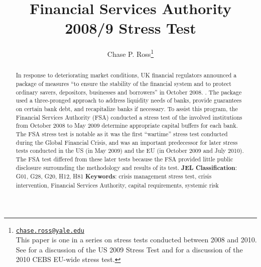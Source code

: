 \documentclass[12pt]{article}
\begin{document}
\lhead{}
\rhead{}

\renewcommand{\headrulewidth}{0.0pt}
\renewcommand{\footrulewidth}{0.0pt}


\title{Financial Services Authority 2008/9 Stress Test}
\author{Chase P. Ross\thanks{\texttt{\href{mailto:chase.ross@yale.edu}{chase.ross@yale.edu}} \\ This paper is one in a series on stress tests conducted between 2008 and 2010. See \citet{Ross2016a} for a discussion of the US 2009 Stress Test and \citet{Ross2016b} for a discussion of the 2010 CEBS EU-wide stress test.}}



\maketitle

\begin{abstract}

In response to deteriorating market conditions, UK financial regulators announced a package of measures ``to ensure the stability of the financial system and to protect ordinary savers, depositors, businesses and borrowers'' in October 2008. \citep{BRSAnnouncement}. The package used a three-pronged approach to address liquidity needs of banks, provide guarantees on certain bank debt, and recapitalize banks if necessary. To assist this program, the Financial Services Authority (FSA) conducted a stress test of the involved institutions from October 2008 to May 2009 determine appropriate capital buffers for each bank. The FSA stress test is notable as it was the first ``wartime'' stress test conducted during the Global Financial Crisis, and was an important predecessor for later stress tests conducted in the US (in May 2009) and the EU (in October 2009 and July 2010). The FSA test differed from these later tests because the FSA provided little public disclosure surrounding the methodology and results of its test.
\newline
\newline
\textbf{JEL Classification}: G01, G28, G20, H12, H81
\newline
\newline
\textbf{Keywords}: crisis management stress test, crisis intervention, Financial Services Authority, capital requirements, systemic risk

\end{abstract}
\newpage
\tableofcontents
\newpage
\end{document}
